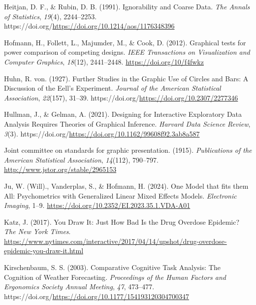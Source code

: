 \documentclass[
  10pt,
  letterpaper,
  DIV=11,
  numbers=noendperiod]{scrartcl}
\newlength{\cslhangindent}
\newenvironment{CSLReferences}[2] %
 {\begin{list}{}{%
  \setlength{\itemindent}{0pt}
  \setlength{\leftmargin}{0pt}
  \setlength{\parsep}{0pt}
  \ifodd #1
   \setlength{\leftmargin}{\cslhangindent}
   \setlength{\itemindent}{-1\cslhangindent}
  \fi
  \setlength{\itemsep}{#2\baselineskip}}}
 {\end{list}}
\providecommand{\DIFaddbegin}{} %
\providecommand{\DIFaddend}{} %
\providecommand{\DIFdelbegin}{} %
\providecommand{\DIFdelend}{} %
\newcommand{\DIFscaledelfig}{0.5}
\newlength{\DIFdelgraphicswidth} %
\newlength{\DIFdelgraphicsheight} %
\newcommand{\DIFaddincludegraphics}[2][]{{\color{blue}\fbox{\DIFOincludegraphics[#1]{#2}}}} %
\newcommand{\DIFdelincludegraphics}[2][]{%
\sbox{\DIFdelgraphicsbox}{\DIFOincludegraphics[#1]{#2}}%
\settoboxwidth{\DIFdelgraphicswidth}{\DIFdelgraphicsbox} %
\settoboxtotalheight{\DIFdelgraphicsheight}{\DIFdelgraphicsbox} %
\scalebox{\DIFscaledelfig}{%
\parbox[b]{\DIFdelgraphicswidth}{\usebox{\DIFdelgraphicsbox}\\[-\baselineskip] \rule{\DIFdelgraphicswidth}{0em}}\llap{\resizebox{\DIFdelgraphicswidth}{\DIFdelgraphicsheight}{%
\setlength{\unitlength}{\DIFdelgraphicswidth}%
\begin{picture}(1,1)%
\thicklines\linethickness{2pt} %
{\color[rgb]{1,0,0}\put(0,0){\framebox(1,1){}}}%
{\color[rgb]{1,0,0}\put(0,0){\line( 1,1){1}}}%
{\color[rgb]{1,0,0}\put(0,1){\line(1,-1){1}}}%
\end{picture}%
}\hspace*{3pt}}} %
} %
\DeclareRobustCommand{\DIFaddbegin}{\DIFOaddbegin \let\includegraphics\DIFaddincludegraphics} %
\DeclareRobustCommand{\DIFaddend}{\DIFOaddend \let\includegraphics\DIFOincludegraphics} %
\DeclareRobustCommand{\DIFdelbegin}{\DIFOdelbegin \let\includegraphics\DIFdelincludegraphics} %
\DeclareRobustCommand{\DIFdelend}{\DIFOaddend \let\includegraphics\DIFOincludegraphics} %
\begin{document}
\begin{CSLReferences}{1}{0}
\DIFaddend {}
Heitjan, D. F., \& Rubin, D. B. (1991). Ignorability and {Coarse}
{Data}. \emph{The Annals of Statistics}, \emph{19}(4), 2244--2253.
https://doi.org/\url{https://doi.org/10.1214/aos/1176348396}

Hofmann, H., Follett, L., Majumder, M., \& Cook, D. (2012). Graphical
tests for power comparison of competing designs. \emph{IEEE Transactions
on Visualization and Computer Graphics}, \emph{18}(12), 2441--2448.
\DIFdelbegin %
\DIFdelend \DIFaddbegin \url{https://doi.org/10/f4fwkz}
\DIFaddend 

Huhn, R. von. (1927). Further {Studies} in the {Graphic} {Use} of
{Circles} and {Bars}: {A} {Discussion} of the {Eell}'s {Experiment}.
\emph{Journal of the American Statistical Association}, \emph{22}(157),
31--39. https://doi.org/\url{https://doi.org/10.2307/2277346}

Hullman, J., \& Gelman, A. (2021). Designing for {Interactive}
{Exploratory} {Data} {Analysis} {Requires} {Theories} of {Graphical}
{Inference}. \emph{Harvard Data Science Review}, \emph{3}(3).
https://doi.org/\url{https://doi.org/10.1162/99608f92.3ab8a587}

Joint committee on standards for graphic presentation. (1915).
\emph{Publications of the American Statistical Association},
\emph{14}(112), 790--797. \url{http://www.jstor.org/stable/2965153}

Ju, W. (Will)., Vanderplas, S., \& Hofmann, H. (2024). One {Model} that
fits them {All}: {Psychometrics} with {Generalized Linear Mixed Effects
Models}. \emph{Electronic Imaging}, 1--9.
\url{https://doi.org/10.2352/EI.2023.35.1.VDA-A01}

Katz, J. (2017). You {Draw} {It}: {Just} {How} {Bad} {Is} the {Drug}
{Overdose} {Epidemic}? \emph{The New York Times}.
\url{https://www.nytimes.com/interactive/2017/04/14/upshot/drug-overdose-epidemic-you-draw-it.html}

Kirschenbaum, S. S. (2003). Comparative {Cognitive} {Task} {Analysis}:
{The} {Cognition} of {Weather} {Forecasting}. \emph{Proceedings of the
{Human} {Factors} and {Ergonomics} {Society} {Annual} {Meeting}},
\emph{47}, 473--477.
https://doi.org/\url{https://doi.org/10.1177/154193120304700347}


\end{CSLReferences}
\end{document}
